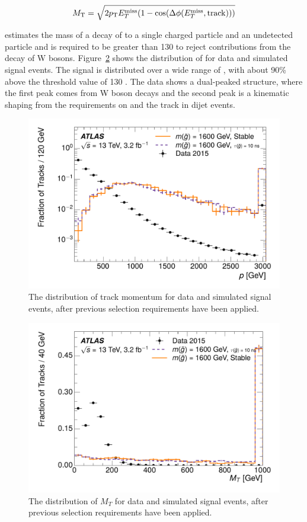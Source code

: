 \begin{equation}
 M_{\mathrm{T}} = \sqrt{2 p_{\mathrm{T}} E_T^{\mathrm{miss}} (1-\cos(\Delta\phi (E_T^{\mathrm{miss}},\mathrm{track})) ) }
\end{equation}

\noindent estimates the mass of a decay of to a single charged particle and an undetected particle and is required to be greater than 130 \GeV to reject contributions from the decay of W bosons.
Figure~\ref{fig:nm1_mt} shows the distribution of \mt for data and simulated signal events.
The signal is distributed over a wide range of \mt, with about 90\% above the threshold value of 130 \GeV. 
The data shows a dual-peaked structure, where the first peak comes from W boson decays and the second peak is a kinematic shaping from the requirements on \met and the track \pt in dijet events.

\begin{figure}[h]
\centering
\includegraphics[width=\fullfig]{figures/selection_p_nm1.pdf}
\caption{The distribution of track momentum for data and simulated signal events, after previous selection requirements have been applied.}
\label{fig:nm1_p}
\end{figure}


\begin{figure}[h]
\centering
\includegraphics[width=\fullfig]{figures/selection_mt_nm1.pdf}
\caption{The distribution of $M_T$ for data and simulated signal events, after previous selection requirements have been applied.}
\label{fig:nm1_mt}
\end{figure}

